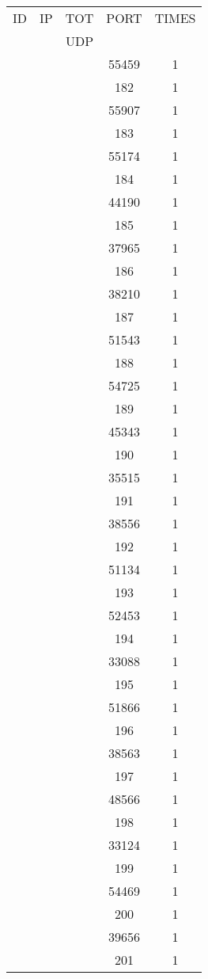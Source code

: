 \documentclass[a4paper]{scrartcl}
\begin{document}
\begin{minipage}[b]{0.5\linewidth}
\begin{tabular}{| c | c | c | c | c |}
\hline
ID & IP & TOT & PORT & TIMES \\ 
   &    & UDP &      &       \\ 
\hline
& & & 55459 & 1 \\ & & & 182 & 1 \\ & & & 55907 & 1 \\ & & & 183 & 1 \\ & & & 55174 & 1 \\ & & & 184 & 1 \\ & & & 44190 & 1 \\ & & & 185 & 1 \\ & & & 37965 & 1 \\ & & & 186 & 1 \\ & & & 38210 & 1 \\ & & & 187 & 1 \\ & & & 51543 & 1 \\ & & & 188 & 1 \\ & & & 54725 & 1 \\ & & & 189 & 1 \\ & & & 45343 & 1 \\ & & & 190 & 1 \\ & & & 35515 & 1 \\ & & & 191 & 1 \\ & & & 38556 & 1 \\ & & & 192 & 1 \\ & & & 51134 & 1 \\ & & & 193 & 1 \\ & & & 52453 & 1 \\ & & & 194 & 1 \\ & & & 33088 & 1 \\ & & & 195 & 1 \\ & & & 51866 & 1 \\ & & & 196 & 1 \\ & & & 38563 & 1 \\ & & & 197 & 1 \\ & & & 48566 & 1 \\ & & & 198 & 1 \\ & & & 33124 & 1 \\ & & & 199 & 1 \\ & & & 54469 & 1 \\ & & & 200 & 1 \\ & & & 39656 & 1 \\ & & & 201 & 1 \\ \hline\end{tabular}\end{minipage} \hfill\begin{minipage}[b]{0.5\linewidth}\begin{tabular}{| c | c | c | c | c |}

\end{tabular}
\end{minipage}
\end{document}
